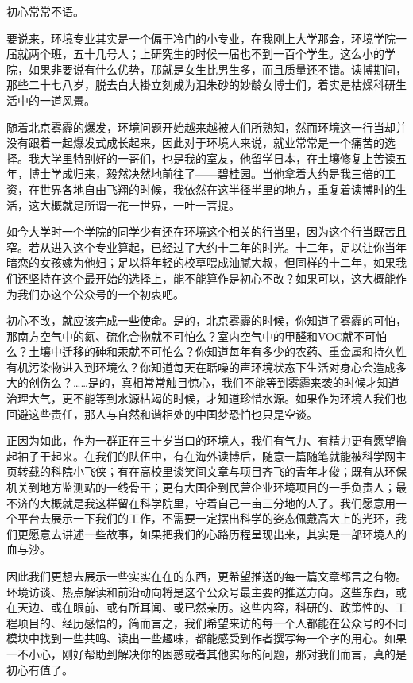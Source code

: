 \documentclass[]{book}
\begin{document}
初心常常不语。

要说来，环境专业其实是一个偏于冷门的小专业，在我刚上大学那会，环境学院一届就两个班，五十几号人；上研究生的时候一届也不到一百个学生。这么小的学院，如果非要说有什么优势，那就是女生比男生多，而且质量还不错。读博期间，那些二十七八岁，脱去白大褂立刻成为泪朱砂的妙龄女博士们，着实是枯燥科研生活中的一道风景。

随着北京雾霾的爆发，环境问题开始越来越被人们所熟知，然而环境这一行当却并没有跟着一起爆发式成长起来，因此对于环境人来说，就业常常是一个痛苦的选择。我大学里特别好的一哥们，也是我的室友，他留学日本，在土壤修复上苦读五年，博士学成归来，毅然决然地前往了------碧桂园。当他拿着大约是我三倍的工资，在世界各地自由飞翔的时候，我依然在这半径半里的地方，重复着读博时的生活，这大概就是所谓一花一世界，一叶一菩提。

如今大学时一个学院的同学少有还在环境这个相关的行当里，因为这个行当既苦且窄。若从进入这个专业算起，已经过了大约十二年的时光。十二年，足以让你当年暗恋的女孩嫁为他妇；足以将年轻的校草喂成油腻大叔，但同样的十二年，如果我们还坚持在这个最开始的选择上，能不能算作是初心不改？如果可以，这大概能作为我们办这个公众号的一个初衷吧。

初心不改，就应该完成一些使命。是的，北京雾霾的时候，你知道了雾霾的可怕，那南方空气中的氮、硫化合物就不可怕么？室内空气中的甲醛和VOC就不可怕么？土壤中迁移的砷和汞就不可怕么？你知道每年有多少的农药、重金属和持久性有机污染物进入到环境么？你知道每天在聒噪的声环境状态下生活对身心会造成多大的创伤么？\ldots{}\ldots{}是的，真相常常触目惊心，我们不能等到雾霾来袭的时候才知道治理大气，更不能等到水源枯竭的时候，才知道珍惜水源。如果作为环境人我们也回避这些责任，那人与自然和谐相处的中国梦恐怕也只是空谈。

正因为如此，作为一群正在三十岁当口的环境人，我们有气力、有精力更有愿望撸起袖子干起来。在我们的队伍中，有在海外读博后，随意一篇随笔就能被科学网主页转载的科院小飞侠；有在高校里谈笑间文章与项目齐飞的青年才俊；既有从环保机关到地方监测站的一线骨干；更有大国企到民营企业环境项目的一手负责人；最不济的大概就是我这样留在科学院里，守着自己一亩三分地的人了。我们愿意用一个平台去展示一下我们的工作，不需要一定摆出科学的姿态佩戴高大上的光环，我们更愿意去讲述一些故事，如果把我们的心路历程呈现出来，其实是一部环境人的血与沙。

因此我们更想去展示一些实实在在的东西，更希望推送的每一篇文章都言之有物。环境访谈、热点解读和前沿动向将是这个公众号最主要的推送方向。这些东西，或在天边、或在眼前、或有所耳闻、或已然亲历。这些内容，科研的、政策性的、工程项目的、经历感悟的，简而言之，我们希望来访的每一个人都能在公众号的不同模块中找到一些共鸣、读出一些趣味，都能感受到作者撰写每一个字的用心。如果一不小心，刚好帮助到解决你的困惑或者其他实际的问题，那对我们而言，真的是初心有值了。
\end{document}
